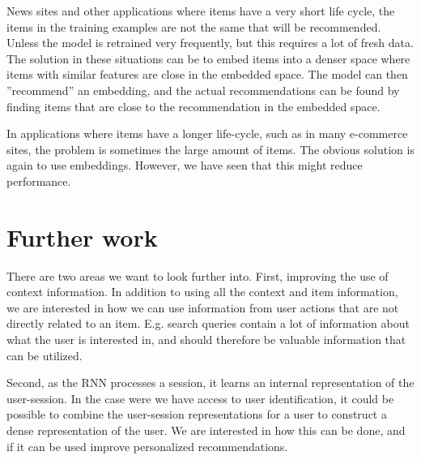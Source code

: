 News sites and other applications where items have a very short life cycle, the items in the training examples are not the same that will be recommended. Unless the model is retrained very frequently, but this requires a lot of fresh data. The solution in these situations can be to embed items into a denser space where items with similar features are close in the embedded space. The model can then ''recommend'' an embedding, and the actual recommendations can be found by finding items that are close to the recommendation in the embedded space.

In applications where items have a longer life-cycle, such as in many e-commerce sites, the problem is sometimes the large amount of items. The obvious solution is again to use embeddings. However, we have seen that this might reduce performance. 
 

\section{Further work}
There are two areas we want to look further into. First, improving the use of context information. In addition to using all the context and item information, we are interested in how we can use information from user actions that are not directly related to an item. E.g. search queries contain a lot of information about what the user is interested in, and should therefore be valuable information that can be utilized. 

Second, as the RNN processes a session, it learns an internal representation of the user-session. In the case were we have access to user identification, it could be possible to combine the user-session representations for a user to construct a dense representation of the user. We are interested in how this can be done, and if it can be used improve personalized recommendations.



